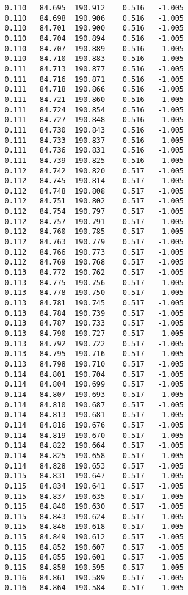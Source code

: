 \begin{verbatim}
   0.110   84.695  190.912    0.516   -1.005
   0.110   84.698  190.906    0.516   -1.005
   0.110   84.701  190.900    0.516   -1.005
   0.110   84.704  190.894    0.516   -1.005
   0.110   84.707  190.889    0.516   -1.005
   0.110   84.710  190.883    0.516   -1.005
   0.111   84.713  190.877    0.516   -1.005
   0.111   84.716  190.871    0.516   -1.005
   0.111   84.718  190.866    0.516   -1.005
   0.111   84.721  190.860    0.516   -1.005
   0.111   84.724  190.854    0.516   -1.005
   0.111   84.727  190.848    0.516   -1.005
   0.111   84.730  190.843    0.516   -1.005
   0.111   84.733  190.837    0.516   -1.005
   0.111   84.736  190.831    0.516   -1.005
   0.111   84.739  190.825    0.516   -1.005
   0.112   84.742  190.820    0.517   -1.005
   0.112   84.745  190.814    0.517   -1.005
   0.112   84.748  190.808    0.517   -1.005
   0.112   84.751  190.802    0.517   -1.005
   0.112   84.754  190.797    0.517   -1.005
   0.112   84.757  190.791    0.517   -1.005
   0.112   84.760  190.785    0.517   -1.005
   0.112   84.763  190.779    0.517   -1.005
   0.112   84.766  190.773    0.517   -1.005
   0.112   84.769  190.768    0.517   -1.005
   0.113   84.772  190.762    0.517   -1.005
   0.113   84.775  190.756    0.517   -1.005
   0.113   84.778  190.750    0.517   -1.005
   0.113   84.781  190.745    0.517   -1.005
   0.113   84.784  190.739    0.517   -1.005
   0.113   84.787  190.733    0.517   -1.005
   0.113   84.790  190.727    0.517   -1.005
   0.113   84.792  190.722    0.517   -1.005
   0.113   84.795  190.716    0.517   -1.005
   0.113   84.798  190.710    0.517   -1.005
   0.114   84.801  190.704    0.517   -1.005
   0.114   84.804  190.699    0.517   -1.005
   0.114   84.807  190.693    0.517   -1.005
   0.114   84.810  190.687    0.517   -1.005
   0.114   84.813  190.681    0.517   -1.005
   0.114   84.816  190.676    0.517   -1.005
   0.114   84.819  190.670    0.517   -1.005
   0.114   84.822  190.664    0.517   -1.005
   0.114   84.825  190.658    0.517   -1.005
   0.114   84.828  190.653    0.517   -1.005
   0.115   84.831  190.647    0.517   -1.005
   0.115   84.834  190.641    0.517   -1.005
   0.115   84.837  190.635    0.517   -1.005
   0.115   84.840  190.630    0.517   -1.005
   0.115   84.843  190.624    0.517   -1.005
   0.115   84.846  190.618    0.517   -1.005
   0.115   84.849  190.612    0.517   -1.005
   0.115   84.852  190.607    0.517   -1.005
   0.115   84.855  190.601    0.517   -1.005
   0.115   84.858  190.595    0.517   -1.005
   0.116   84.861  190.589    0.517   -1.005
   0.116   84.864  190.584    0.517   -1.005

\end{verbatim}
